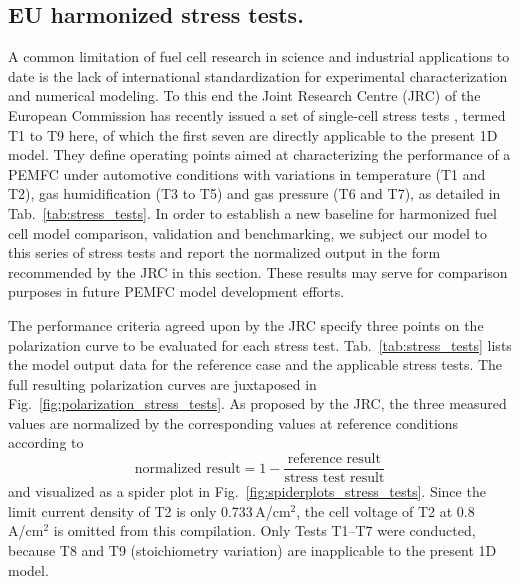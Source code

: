\documentclass[fontsize=9pt,DIV=calc,a4paper,twocolumn]{scrartcl}
\begin{document}
\subsection*{EU harmonized stress tests.}

A common limitation of fuel cell research in science and industrial applications to date is the lack of international standardization for experimental characterization and numerical modeling. To this end the Joint Research Centre (JRC) of the European Commission has recently issued a set of single-cell stress tests \cite{tsotridis:15}, termed T1 to T9 here, of which the first seven are directly applicable to the present 1D model. They define operating points aimed at characterizing the performance of a PEMFC under automotive conditions with variations in temperature (T1 and T2), gas humidification (T3 to T5) and gas pressure (T6 and T7), as detailed in Tab.~\ref{tab:stress_tests}. In order to establish a new baseline for harmonized fuel cell model comparison, validation and benchmarking, we subject our model to this series of stress tests and report the normalized output in the form recommended by the JRC in this section. These results may serve for comparison purposes in future PEMFC model development efforts.

The performance criteria agreed upon by the JRC specify three points on the polarization curve to be evaluated for each stress test. Tab.~\ref{tab:stress_tests} lists the model output data for the reference case and the applicable stress tests. The full resulting polarization curves are juxtaposed in Fig.~\ref{fig:polarization_stress_tests}. As proposed by the JRC, the three measured values are normalized by the corresponding values at reference conditions according to
%
\begin{equation}
\textrm{normalized result} = 1-\frac{\textrm{reference result}}{\textrm{stress test result}}
\end{equation}
%
and visualized as a spider plot in Fig.~\ref{fig:spiderplots_stress_tests}. Since the limit current density of T2 is only 0.733\,A/cm$^2$, the cell voltage of T2 at 0.8\,A/cm$^2$ is omitted from this compilation. Only Tests T1--T7 were conducted, because T8 and T9 (stoichiometry variation) are inapplicable to the present 1D model.
\end{document}
